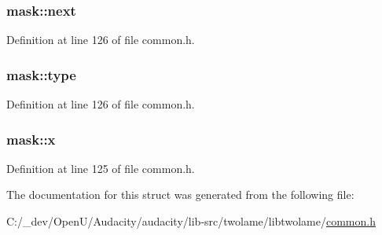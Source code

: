 \subsubsection[{\texorpdfstring{next}{next}}]{ mask\+::next}\hypertarget{structmask_a9b432c51c3485f1630fee3b8a37f2331}{}\label{structmask_a9b432c51c3485f1630fee3b8a37f2331}


Definition at line 126 of file common.\+h.

\subsubsection[{\texorpdfstring{type}{type}}]{ mask\+::type}\hypertarget{structmask_a83d6d319f1f4d045776dfdc4355282ac}{}\label{structmask_a83d6d319f1f4d045776dfdc4355282ac}


Definition at line 126 of file common.\+h.

\subsubsection[{\texorpdfstring{x}{x}}]{ mask\+::x}\hypertarget{structmask_a9de036816c9a31cb8840c86c03e5304e}{}\label{structmask_a9de036816c9a31cb8840c86c03e5304e}


Definition at line 125 of file common.\+h.



The documentation for this struct was generated from the following file\+:\begin{DoxyCompactItemize}
\item 
C\+:/\+\_\+dev/\+Open\+U/\+Audacity/audacity/lib-\/src/twolame/libtwolame/\hyperlink{twolame_2libtwolame_2common_8h}{common.\+h}\end{DoxyCompactItemize}
